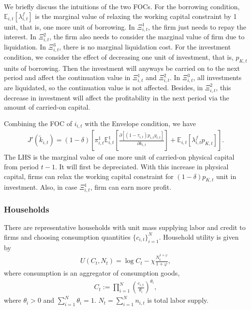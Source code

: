 \documentclass[12pt]{article}
\numberwithin{equation}{section}
\begin{document}
We briefly discuss the intuitions of the two FOCs. For the borrowing condition, $\mathbb{E}_{i,t}\left[\lambda^f_{i,t}\right]$ is the marginal value of relaxing the working capital constraint by 1 unit, that is, one more unit of borrowing. In $\Xi^1_{i,t}$, the firm just needs to repay the interest. In $\Xi^2_{i,t}$, the firm also needs to consider the marginal value of firm due to liquidation. In $\Xi^3_{i,t}$, there is no marginal liquidation cost. For the investment condition, we consider the effect of decreasing one unit of investment, that is, $p_{K,t}$ units of borrowing. Then the investment will anyways be carried on to the next period and affect the continuation value in $\Xi^1_{i,t}$ and $\Xi^2_{i,t}$. In $\Xi^3_{i,t}$, all investments are liquidated, so the continuation value is not affected. Besides, in $\Xi^2_{i,t}$, this decrease in investment will affect the profitability in the next period via the amount of carried-on capital.

Combining the FOC of $i_{i,t}$ with the Envelope condition, we have
\begin{align}\label{eq:first_stage_envelope}
    J'(\tilde{k}_{i,t}) = (1-\delta) \left[\pi^1_{i,t}\mathbb{E}^1_{i,t} \left[\frac{\partial [(1-\tau_{i,t})p_{i,t} y_{i,t}]}{\partial k_{i,t}}\right] + \mathbb{E}_{i,t} \left[\lambda^f_{i,t} p_{K,t}\right]\right].
\end{align}
The LHS is the marginal value of one more unit of carried-on physical capital from period $t-1$. It will first be depreciated. With this increase in physical capital, firms can relax the working capital constraint for $(1-\delta)p_{K,t}$ unit in investment. Also, in case $\Xi^1_{i,t}$, firm can earn more profit. 

\subsubsection{Households}

There are representative households with unit mass supplying labor and credit to firms and choosing consumption quantities $\{c_{i,t}\}_{i=1}^{N}$. Household utility is given by
\begin{align}\label{eq:hh_utility}
    U(C_t,N_t)
    =
    \log C_t
    -
    \chi\frac{N_t^{1+\varphi}}{1+\varphi},
\end{align}
where consumption is an aggregator of consumption goods,
\begin{align*}
    C_t
    :=
    \prod_{i=1}^{N}
    \left(
        \frac{c_{i,t}}{\theta_i}
    \right)^{\theta_i},
\end{align*}
where $\theta_i>0$ and $\sum_{i=1}^N \theta_i=1$. $N_t=\sum_{i=1}^{N}n_{i,t}$ is total labor supply.
\end{document}
